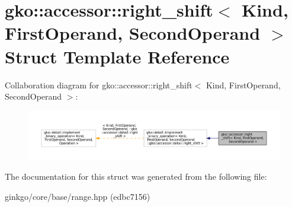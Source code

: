 \hypertarget{structgko_1_1accessor_1_1right__shift}{}\section{gko\+:\+:accessor\+:\+:right\+\_\+shift$<$ Kind, First\+Operand, Second\+Operand $>$ Struct Template Reference}
\label{structgko_1_1accessor_1_1right__shift}


Collaboration diagram for gko\+:\+:accessor\+:\+:right\+\_\+shift$<$ Kind, First\+Operand, Second\+Operand $>$\+:
\nopagebreak
\begin{figure}[H]
\begin{center}
\leavevmode
\includegraphics[width=350pt]{structgko_1_1accessor_1_1right__shift__coll__graph}
\end{center}
\end{figure}


The documentation for this struct was generated from the following file\+:\begin{DoxyCompactItemize}
\item 
ginkgo/core/base/range.\+hpp (edbc7156)\end{DoxyCompactItemize}
